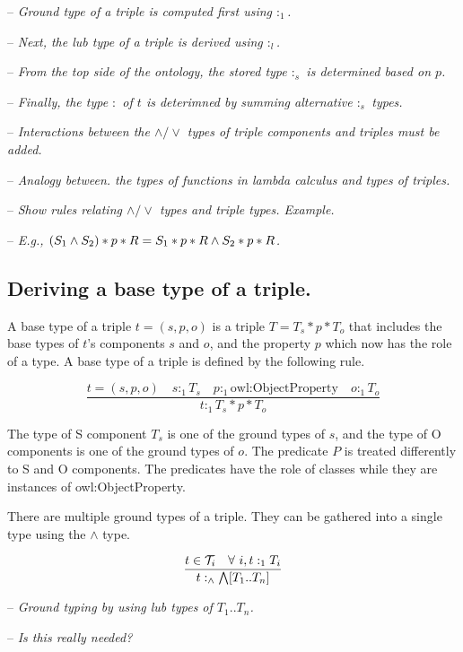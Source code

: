 \documentclass[runningheads]{llncs}
\newcommand{\Ti}{{\cal T}_i}
\newcommand{\memo}[1]{}
\newcommand{\notes}[1]{\noindent\begin{small}-- \emph{#1}\\\end{small}}
\begin{document}
\notes{Ground type of a triple is computed first using $:_1$.}
\notes{Next, the lub type of a triple is derived using $:_l$.}
\notes{From the top side of the ontology, the stored type $:_s$ is determined based on $p$.}
\notes{Finally, the type $:$ of $t$ is deterimned by summing alternative $:_s$ types.}

\notes{Interactions between the $\land/\lor$ types of triple components and triples must be added.}
\notes{Analogy between. the types of functions in lambda calculus and types of triples.}
\notes{Show rules relating $\land/\lor$ types and triple types. Example.}
\notes{E.g., $(S_1\land\/S_2)*p*R = S_1*p*R\land\/S_2*p*R$.}




\subsection{Deriving a base type of a triple.}

\memo{\noindent The base type of an individual identifier $i$ is a
  class $c$ related to $i$ by one-step relationship $\preceq_1$. In
  terms of the concepts of a knowledge graph, $c$ and $i$ are related
  by the relationship rdf:type.}

A base type of a triple $t=(s,p,o)$ is a triple $T=T_s*p*T_o$ that
includes the base types of $t$'s components $s$ and $o$, and the
property $p$ which now has the role of a type. A base type of a triple
is defined by the following rule.

\begin{equation}
  \label{rul:3-ground}
\dfrac{t=(s,p,o)\quad s:_1T_s\quad p:_1\text{owl:ObjectProperty}\quad o:_1T_o}
      {t:_1T_s*p*T_o}
\end{equation}

The type of S component $T_s$ is one of the ground types of $s$, and
the type of O components is one of the ground types of $o$. The
predicate $P$ is treated differently to S and O components. The
predicates have the role of classes while they are instances of
owl:ObjectProperty.

There are multiple ground types of a triple. They can be gathered into
a single type using the $\land$ type.

\begin{equation}
\dfrac{t\in \Ti\quad \forall\ i, t:_1T_i}
      {t:_\land\bigwedge[T_1..T_n]}
\end{equation}


\notes{Ground typing by using lub types of $T_1..T_n$.}
\notes{Is this really needed?}
\end{document}
